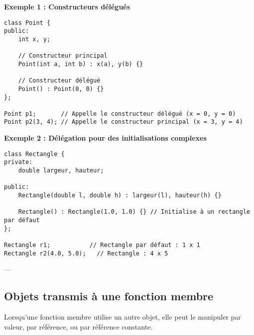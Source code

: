 \textbf{Exemple 1 : Constructeurs délégués}
\begin{tcolorbox}[colframe=blue!50!black, colback=blue!5!white, title=Exemple d'Attributs et Méthodes Statistiques, float=htb]
\begin{verbatim}
class Point {
public:
    int x, y;

    // Constructeur principal
    Point(int a, int b) : x(a), y(b) {}

    // Constructeur délégué
    Point() : Point(0, 0) {}
};

Point p1;       // Appelle le constructeur délégué (x = 0, y = 0)
Point p2(3, 4); // Appelle le constructeur principal (x = 3, y = 4)
\end{verbatim}
\end{tcolorbox}
\textbf{Exemple 2 : Délégation pour des initialisations complexes}
\begin{tcolorbox}[colframe=blue!50!black, colback=blue!5!white, title=Exemple d'Attributs et Méthodes Statistiques, float=htb]
\begin{verbatim}
class Rectangle {
private:
    double largeur, hauteur;

public:
    Rectangle(double l, double h) : largeur(l), hauteur(h) {}

    Rectangle() : Rectangle(1.0, 1.0) {} // Initialise à un rectangle par défaut
};

Rectangle r1;           // Rectangle par défaut : 1 x 1
Rectangle r2(4.0, 5.0);   // Rectangle : 4 x 5
\end{verbatim}
\end{tcolorbox}
---

\subsection{ Objets transmis à une fonction membre}
Lorsqu'une fonction membre utilise un autre objet, elle peut le manipuler par valeur, par référence, ou par référence constante.

